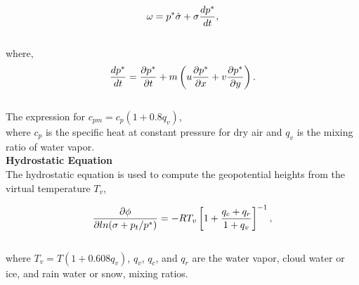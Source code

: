 \begin{eqnarray}
\omega = p^{\ast} \dot{\sigma} + \sigma {dp^{\ast} \over dt},
\end{eqnarray}
\noindent \\
where,
\begin{eqnarray}
{dp^{\ast} \over dt} = {\partial{p^{\ast}} \over \partial{t}} + m 
\left( u {\partial{p^{\ast}} \over \partial{x}} + 
v {\partial{p^{\ast}} \over \partial{y}} \right).
\end{eqnarray} \\

\noindent
The expression for $c_{pm} = c_p(1+0.8q_v)$,
\noindent \\
where $c_p$ is the specific heat at constant pressure for dry air and $q_v$ is the
mixing ratio of water vapor.
\\

\noindent
{\bf Hydrostatic Equation} \\
\noindent
The hydrostatic equation is used to compute the geopotential heights from the 
virtual temperature $T_v$,

\begin{eqnarray}
{\partial{\phi} \over \partial l n (\sigma + p_t / p^{\ast})} = -RT_v
\left[ 1 + {q_c + q_r \over 1 + q_v} \right]^{-1},
\end{eqnarray}
\noindent \\
where $T_v = T(1 + 0.608q_v)$, $q_v$, $q_c$, and $q_r$ are the 
water vapor, cloud water or ice, and rain water or snow, 
mixing ratios.  


